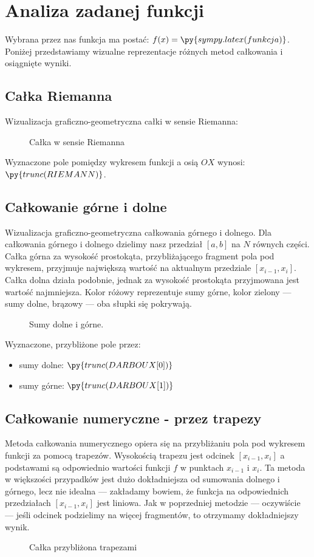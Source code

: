 \documentclass[a4paper]{article}
\begin{document}
\section{Analiza zadanej funkcji}
Wybrana przez nas funkcja ma postać: $f(x) = \py{sympy.latex(funkcja)}$. Poniżej przedstawiamy wizualne reprezentacje różnych metod całkowania i osiągnięte wyniki.

\subsection{Całka Riemanna}
Wizualizacja graficzno-geometryczna całki w sensie Riemanna:
\begin{figure}[h]
	
	\caption{Całka w sensie Riemanna}
\end{figure}

Wyznaczone pole pomiędzy wykresem funkcji a osią $OX$ wynosi: $\py{trunc(RIEMANN)}$.

\subsection{Całkowanie górne i dolne}
Wizualizacja graficzno-geometryczna całkowania górnego i dolnego. Dla całkowania górnego i dolnego dzielimy nasz przedział $[a, b]$ na $N$ równych części. Całka górna za wysokość prostokąta, przybliżającego fragment pola pod wykresem, przyjmuje największą wartość na aktualnym przedziale $[x_{i-1}, x_i]$. Całka dolna działa podobnie, jednak za wysokość prostokąta przyjmowana jest wartość najmniejsza. Kolor różowy reprezentuje sumy górne, kolor zielony --- sumy dolne, brązowy --- oba słupki się pokrywają.

\begin{figure}[h]
	
	\caption{Sumy dolne i górne.}
\end{figure}

Wyznaczone, przybliżone pole przez:
\begin{itemize}
	\item sumy dolne: $\py{trunc(DARBOUX[0])}$
	\item sumy górne: $\py{trunc(DARBOUX[1])}$
\end{itemize} 

\subsection{Całkowanie numeryczne - przez trapezy}
Metoda całkowania numerycznego opiera się na przybliżaniu pola pod wykresem funkcji za pomocą trapezów. Wysokością trapezu jest odcinek $[x_{i-1}, x_i]$ a podstawami są odpowiednio wartości funkcji $f$ w punktach $x_{i-1}$ i $x_i$. Ta metoda w większości przypadków jest dużo dokładniejsza od sumowania dolnego i górnego, lecz nie idealna --- zakładamy bowiem, że funkcja na odpowiednich przedziałach $[x_{i-1}, x_i]$ jest liniowa. Jak w poprzedniej metodzie --- oczywiście --- jeśli odcinek podzielimy na więcej fragmentów, to otrzymamy dokładniejszy wynik.
\vspace{4cm}
\begin{figure}[ht]
	
	\caption{Całka przybliżona trapezami}
\end{figure}
\end{document}
